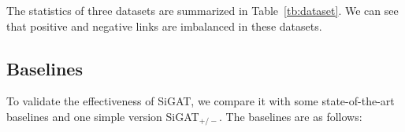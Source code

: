 \documentclass[runningheads]{llncs}
\begin{document}
The statistics of three datasets are summarized in Table~\ref{tb:dataset}. We can see that positive and negative links are imbalanced in these datasets.
\begin{table}[!ht]
\vspace{-10px}
    \centering
    \caption{Statistics of Three Datasets}
    \label{tb:dataset}
   
\vspace{-20px}
\end{table}
\subsection{Baselines}

To validate the effectiveness of SiGAT, we compare it with some state-of-the-art baselines and one simple version SiGAT$_{\mathrm{ +/-}}$. The baselines are as follows:
\end{document}
